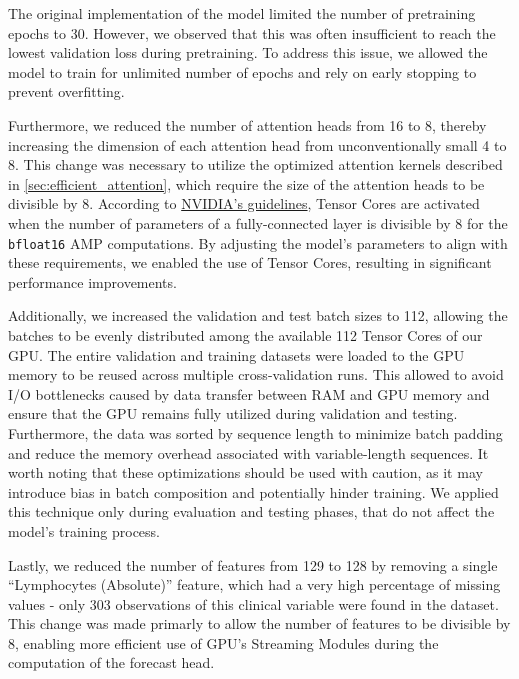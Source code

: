 The original implementation of the  model limited the number of pretraining epochs to \num{30}. However, we observed that this was often insufficient to reach the lowest validation loss during pretraining. To address this issue, we allowed the model to train for unlimited number of epochs and rely on early stopping to prevent overfitting.

Furthermore, we reduced the number of attention heads from \num{16} to \num{8}, thereby increasing the dimension of each attention head from unconventionally small \num{4} to \num{8}. This change was necessary to utilize the optimized attention kernels described in \cref{sec:efficient_attention}, which require the size of the attention heads to be divisible by \num{8}. According to \href{https://developer.nvidia.com/blog/optimizing-gpu-performance-tensor-cores/}{NVIDIA's guidelines}, Tensor Cores are activated when the number of  parameters of a fully-connected layer is divisible by \num{8} for the \texttt{bfloat16} AMP computations.
By adjusting the model's parameters to align with these requirements, we enabled the use of Tensor Cores, resulting in significant performance improvements.

Additionally, we increased the validation and test batch sizes to \num{112}, allowing the batches to be evenly distributed among the available \num{112} Tensor Cores of our GPU. The entire validation and training datasets were loaded to the GPU memory to be reused across multiple cross-validation runs. This allowed to avoid I/O bottlenecks caused by data transfer between RAM and GPU memory and ensure that the GPU remains fully utilized during validation and testing. Furthermore, the data was sorted by sequence length to minimize batch padding and reduce the memory overhead associated with variable-length sequences. It worth noting that these optimizations should be used with caution, as it may introduce bias in batch composition and potentially hinder training. We applied this technique only during evaluation and testing phases, that do not affect the model's training process.

Lastly, we reduced the number of features from \num{129} to \num{128} by removing a single ``Lymphocytes (Absolute)'' feature, which had a very high percentage of missing values - only \num{303} observations of this clinical variable were found in the dataset. This change was made primarly to allow the number of features to be divisible by \num{8}, enabling more efficient use of GPU's Streaming Modules during the computation of the forecast head.


